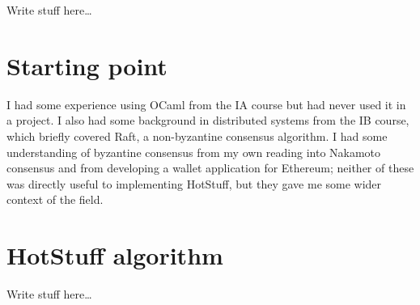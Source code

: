




Write stuff here\dots

\section{Starting point}
I had some experience using OCaml from the IA course but had never used it in a project. I also had some background in distributed systems from the IB course, which briefly covered Raft, a non-byzantine consensus algorithm. I had some understanding of byzantine consensus from my own reading into Nakamoto consensus and from developing a wallet application for Ethereum; neither of these was directly useful to implementing HotStuff, but they gave me some wider context of the field.


\section{HotStuff algorithm}
Write stuff here\dots

